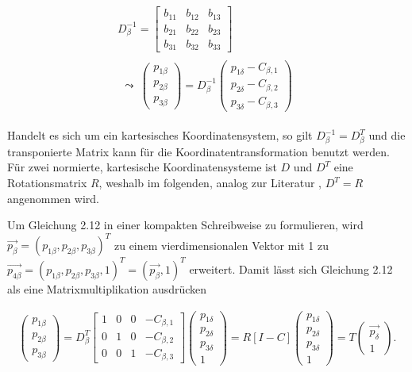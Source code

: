 \begin{gather}
	D_\beta^{-1} = 
	\begin{bmatrix}b_{11} & b_{12} & b_{13}\\
		b_{21} & b_{22} & b_{23}\\
		b_{31} & b_{32} & b_{33}
	\end{bmatrix} \\
	\begin{split}
		\leadsto \: \begin{pmatrix}
			p_{1\beta}\\p_{2\beta}\\ p_{3\beta}
		\end{pmatrix}
		= D_\beta^{-1} 
		\begin{pmatrix}
			p_{1\delta} - C_{\beta,1}\\
			p_{2\delta} - C_{\beta,2}\\
			p_{3\delta} - C_{\beta,3}
		\end{pmatrix}
	\end{split} 
\end{gather}

Handelt es sich um ein kartesisches Koordinatensystem, so gilt $\ensuremath{D_\beta^{-1}}=D_\beta^{T}$ und die transponierte Matrix kann für die Koordinatentransformation benutzt werden. Für zwei normierte, kartesische Koordinatensysteme ist $D$ und $D^T$ eine Rotationsmatrix $R$, weshalb im folgenden, analog zur Literatur \cite{HZ,Elements,Ferid}, $D^T=R$ angenommen wird.  

Um Gleichung 2.12 in einer kompakten Schreibweise zu formulieren, wird $\vec{p_{\beta}}=(p_{1\beta},p_{2\beta},p_{3\beta})^T$ zu einem vierdimensionalen Vektor mit 1 zu
$\vec{p_{4\beta}}=(p_{1\beta},p_{2\beta},p_{3\beta},1)^T=(\vec{p_{\beta}},1)^T$ erweitert. Damit lässt sich Gleichung 2.12 als eine Matrixmultiplikation ausdrücken

\begin{gather}
	\begin{pmatrix}
		p_{1\beta}\\p_{2\beta}\\ p_{3\beta}
	\end{pmatrix}
	= D_\beta^T	
	\begin{bmatrix}1 & 0 & 0 & - C_{\beta,1}\\
		0 & 1 & 0& - C_{\beta,2}\\
		0 & 0 & 1 & - C_{\beta,3}
	\end{bmatrix} 
	\begin{pmatrix}
		p_{1\delta}\\p_{2\delta}\\ p_{3\delta}\\1
	\end{pmatrix}
	= R	[I -C] 	 \begin{pmatrix}
		p_{1\delta}\\p_{2\delta}\\ p_{3\delta}\\1
	\end{pmatrix}
	= T	\begin{pmatrix}
		\vec{p_\delta}\\1
	\end{pmatrix}.	 \label{eq:trafo}
\end{gather}

